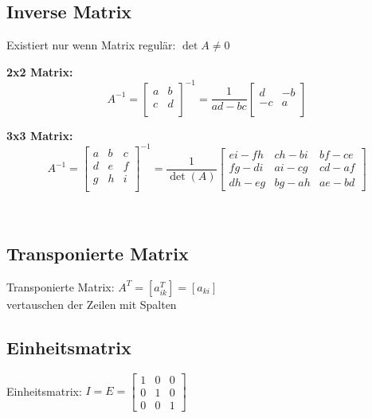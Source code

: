 \subsection{Inverse Matrix}
Existiert nur wenn Matrix regulär: $\det A \neq 0$\\
\begin{minipage}{7cm}
	\textbf{2x2 Matrix:}    
	$$ A^{-1} = \begin{bmatrix} a & b \\ c & d \\ \end{bmatrix}^{-1} = \frac{1}{ad
		- bc} \begin{bmatrix} d & -b \\ -c & a \\ \end{bmatrix} $$
\end{minipage}
\begin{minipage}{11cm}
	\textbf{3x3 Matrix:}
	$$  A^{-1} = \begin{bmatrix} a & b & c\\ d & e & f \\ g & h & i \\ \end{bmatrix}^{-1} =
	\frac{1}{\det(A)} \begin{bmatrix} ei - fh & ch - bi & bf - ce \\ fg - di & ai
	- cg & cd - af \\ dh - eg & bg - ah & ae - bd \end{bmatrix} $$
\end{minipage}\\

\begin{multicols}{2}
	\subsection{Transponierte Matrix}
	Transponierte Matrix:  $A^T=[a_{ik}^T]=[a_{ki}]$ \\
	vertauschen der Zeilen mit Spalten
	
	\subsection{Einheitsmatrix}
	Einheitsmatrix: $I=E= 
	\begin{bmatrix} 
	1&0 & 0\\
	0&1&0\\
	0&0&1                               
	\end{bmatrix}$	
\end{multicols}

